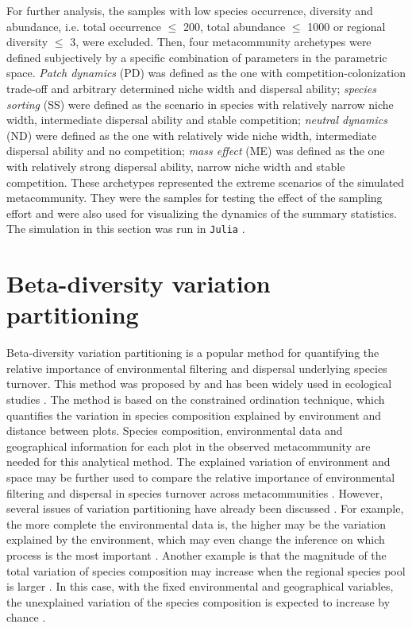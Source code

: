 For further analysis, the samples with low species occurrence, diversity and abundance, i.e. total occurrence $\leq$ 200, total abundance $\leq$ 1000 or regional diversity $\leq$ 3, were excluded. Then, four metacommunity archetypes were defined subjectively by a specific combination of parameters in the parametric space. \textit{Patch dynamics} (PD) was defined as the one with competition-colonization trade-off and arbitrary determined niche width and dispersal ability; \textit{species sorting} (SS) were defined as the scenario in species with relatively narrow niche width, intermediate dispersal ability and stable competition; \textit{neutral dynamics} (ND) were defined as the one with relatively wide niche width, intermediate dispersal ability and no competition; \textit{mass effect} (ME) was defined as the one with relatively strong dispersal ability, narrow niche width and stable competition. These archetypes represented the extreme scenarios of the simulated metacommunity. They were the samples for testing the effect of the sampling effort and were also used for visualizing the dynamics of the summary statistics. The simulation in this section was run in \texttt{Julia} \citep{bezanson2017julia}.

\section{Beta-diversity variation partitioning}
\noindent
\label{sec:VP}
Beta-diversity variation partitioning is a popular method for quantifying the relative importance of environmental filtering and dispersal underlying species turnover. This method was proposed by \citet{borcard1992partialling} and has been widely used in ecological studies \citep{cottenie2005integrating, peres2006variation, smith2010variation}. The method is based on the constrained ordination technique, which quantifies the variation in species composition explained by environment and distance between plots. Species composition, environmental data and geographical information for each plot in the observed metacommunity are needed for this analytical method. The explained variation of environment and space may be further used to compare the relative importance of environmental filtering and dispersal in species turnover across metacommunities \citep{cottenie2005integrating}. However, several issues of variation partitioning have already been discussed \citep[chap.~4]{leibold2017metacommunity}. For example, the more complete the environmental data is, the higher may be the variation explained by the environment, which may even change the inference on which process is the most important \citep{chang2013better}. Another example is that the magnitude of the total variation of species composition may increase when the regional species pool is larger \citep{kraft2011disentangling}. In this case, with the fixed environmental and geographical variables, the unexplained variation of the species composition is expected to increase by chance \citep[pp.~124]{leibold2017metacommunity}.

